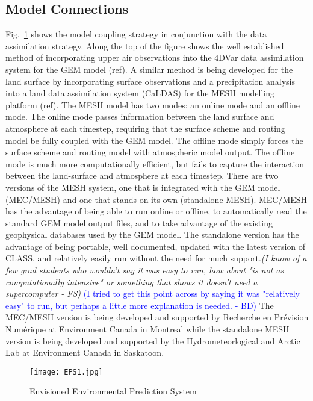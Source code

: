 \documentclass[hess]{copernicus}
\begin{document}
\subsection{Model Connections} %
Fig.~\ref{eps1} shows the model coupling strategy in conjunction with the data assimilation strategy. Along the top of the figure shows the well established method of incorporating upper air observations into the 4DVar data assimilation system for the GEM model (ref). A similar method is being developed for the land surface by incorporating surface observations and a precipitation analysis into a land data assimilation system (CaLDAS) for the MESH modelling platform (ref). The MESH model has two modes: an online mode and an offline mode. The online mode passes information between the land surface and atmosphere at each timestep, requiring that the surface scheme and routing model be fully coupled with the GEM model. The offline mode simply forces the surface scheme and routing model with atmospheric model output. The offline mode is much more computationally efficient, but fails to capture the interaction between the land-surface and atmosphere at each timestep. There are two versions of the MESH system, one that is integrated with the GEM model (MEC/MESH) and one that stands on its own (standalone MESH). MEC/MESH has the advantage of being able to run online or offline, to automatically read the standard GEM model output files, and to take advantage of the existing geophysical databases used by the GEM model. The standalone version has the advantage of being portable, well documented, updated with the latest version of CLASS, and relatively easily run without the need for much support.{\em (I know of a few grad students who wouldn't say it was easy to run, how about "is not as computationally intensive" or something that shows it doesn't need a supercomputer - FS)}\textcolor{blue}{ (I tried to get this point across by saying it was "relatively easy" to run, but perhaps a little more explanation is needed. - BD)}
 The MEC/MESH version is being developed and supported by Recherche en  Pr\'{e}vision Num\'{e}rique at Environment Canada in Montreal while the standalone MESH version is being developed and supported by the Hydrometeorlogical and Arctic Lab at Environment Canada in Saskatoon.

\begin{figure}[h!]
\vspace*{2mm}
\begin{center}
\texttt{[image: EPS1.jpg]}
\end{center}
\caption{Envisioned Environmental Prediction System}
\label{eps1}
\end{figure}
\end{document}
